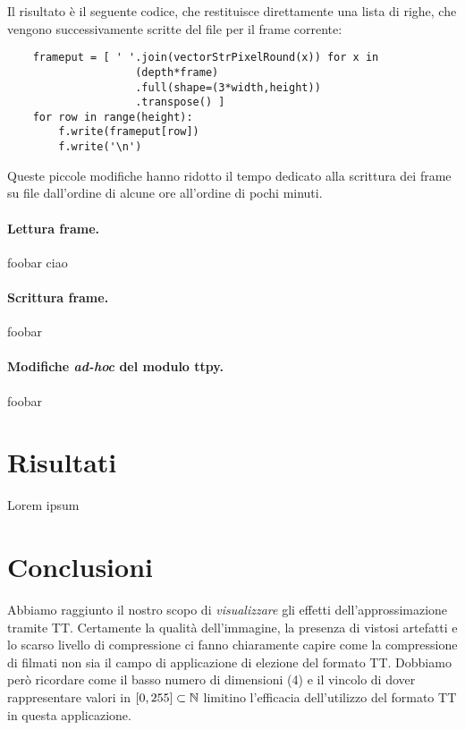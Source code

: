 \documentclass[11pt,a4paper]{article}
\begin{document}
Il risultato è il seguente codice, che restituisce direttamente una lista di righe, che vengono successivamente scritte del file per il frame corrente:
\begin{lstlisting}
    frameput = [ ' '.join(vectorStrPixelRound(x)) for x in 
                    (depth*frame)
                    .full(shape=(3*width,height))
                    .transpose() ]
    for row in range(height):
        f.write(frameput[row])
        f.write('\n')
\end{lstlisting}

Queste piccole modifiche hanno ridotto il tempo dedicato alla scrittura dei frame su file dall'ordine di alcune ore all'ordine di pochi minuti.

\paragraph{Lettura frame.}
foobar ciao

\paragraph{Scrittura frame.}
foobar

\paragraph{Modifiche \emph{ad-hoc} del modulo ttpy.}
foobar

\section{Risultati}
Lorem ipsum

\section{Conclusioni}
Abbiamo raggiunto il nostro scopo di \emph{visualizzare} gli effetti dell'approssimazione tramite TT. Certamente la qualità dell'immagine, la presenza di vistosi artefatti e lo scarso livello di compressione ci fanno chiaramente capire come la compressione di filmati non sia il campo di applicazione di elezione del formato TT.
Dobbiamo però ricordare come il basso numero di dimensioni (4) e il vincolo di dover rappresentare valori in $[0,255]\subset\mathbb{N}$ limitino l'efficacia dell'utilizzo del formato TT in questa applicazione.

\end{document}
